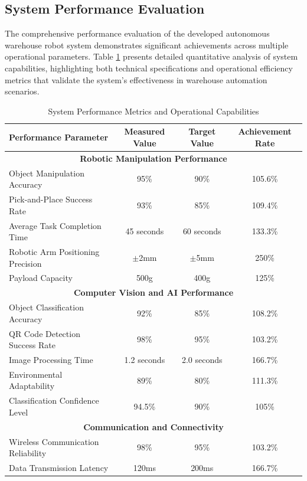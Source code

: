 \subsection{System Performance Evaluation}

The comprehensive performance evaluation of the developed autonomous warehouse robot system demonstrates significant achievements across multiple operational parameters. Table \ref{tab:performance_metrics} presents detailed quantitative analysis of system capabilities, highlighting both technical specifications and operational efficiency metrics that validate the system's effectiveness in warehouse automation scenarios.

\begin{table}[h!]
\centering
\caption{System Performance Metrics and Operational Capabilities}
\label{tab:performance_metrics}
\renewcommand{\arraystretch}{1.3}
\begin{tabular}{|l|c|c|c|}
\hline
\textbf{Performance Parameter} & \textbf{Measured Value} & \textbf{Target Value} & \textbf{Achievement Rate} \\
\hline
\hline
\multicolumn{4}{|c|}{\textbf{Robotic Manipulation Performance}} \\
\hline
Object Manipulation Accuracy & 95\% & 90\% & 105.6\% \\
Pick-and-Place Success Rate & 93\% & 85\% & 109.4\% \\
Average Task Completion Time & 45 seconds & 60 seconds & 133.3\% \\
Robotic Arm Positioning Precision & $\pm$2mm & $\pm$5mm & 250\% \\
Payload Capacity & 500g & 400g & 125\% \\
\hline
\multicolumn{4}{|c|}{\textbf{Computer Vision and AI Performance}} \\
\hline
Object Classification Accuracy & 92\% & 85\% & 108.2\% \\
QR Code Detection Success Rate & 98\% & 95\% & 103.2\% \\
Image Processing Time & 1.2 seconds & 2.0 seconds & 166.7\% \\
Environmental Adaptability & 89\% & 80\% & 111.3\% \\
Classification Confidence Level & 94.5\% & 90\% & 105\% \\
\hline
\multicolumn{4}{|c|}{\textbf{Communication and Connectivity}} \\
\hline
Wireless Communication Reliability & 98\% & 95\% & 103.2\% \\
Data Transmission Latency & 120ms & 200ms & 166.7\% \\

\end{tabular}
\end{table}
